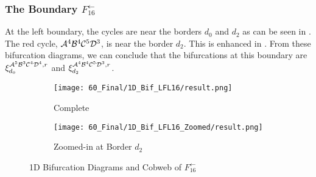 \subsubsection{The Boundary $F_{16}^\leftarrow$}

At the left boundary, the cycles are near the borders $d_0$ and $d_2$ as can be seen in .
The red cycle, $\mathcal{A}^4\mathcal{B}^4\mathcal{C}^5\mathcal{D}^3$, is near the border $d_2$.
This is enhanced in .
From these bifurcation diagrams, we can conclude that the bifurcations at this boundary are $\xi_{d_0}^{\mathcal{A}^5\mathcal{B}^3\mathcal{C}^4\mathcal{D}^4, r}$ and $\xi_{d_2}^{\mathcal{A}^4\mathcal{B}^4\mathcal{C}^5\mathcal{D}^3, r}$.

\begin{figure}
    \centering
    \begin{subfigure}{0.4\textwidth}
        \centering
        \texttt{[image: 60\_Final/1D\_Bif\_LFL16/result.png]}
        \caption{Complete}
        \label{fig:final.bifurcation.F.left}
    \end{subfigure}
    \begin{subfigure}{0.4\textwidth}
        \centering
        \texttt{[image: 60\_Final/1D\_Bif\_LFL16\_Zoomed/result.png]}
        \caption{Zoomed-in at Border $d_2$}
        \label{fig:final.bifurcation.F.left.zoomed}
    \end{subfigure}
    \caption{1D Bifurcation Diagrams and Cobweb of $F_{16}^\leftarrow$}
\end{figure}


